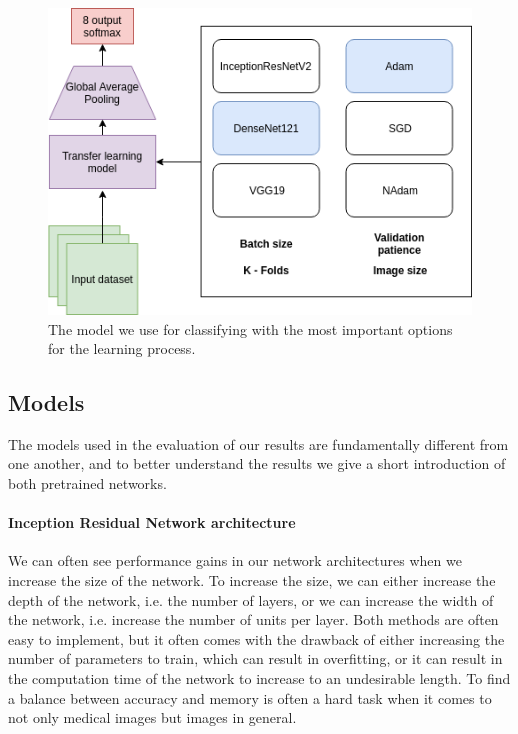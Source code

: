 \begin{figure}[t]
        \centering
        \includegraphics[scale=0.47]{methodology/figures/model.png}
        \caption{ The model we use for classifying with the most important options for the learning process. }
    \label{fig:KTLmodel}
\end{figure}



\subsection{Models}
The models used in the evaluation of our results are fundamentally different from one another, and to better understand the results we give a short introduction of both pretrained networks. 

\paragraph{Inception Residual Network architecture }
We can often see performance gains in our network architectures when we increase the size of the network. To increase the size, we can either increase the depth of the network, i.e. the number of layers, or we can increase the width of the network, i.e. increase the number of units per layer. Both methods are often easy to implement, but it often comes with the drawback of either increasing the number of parameters to train, which can result in overfitting, or it can result in the computation time of the network to increase to an undesirable length.
To find a balance between accuracy and memory is often a hard task when it comes to not only medical images but images in general.

